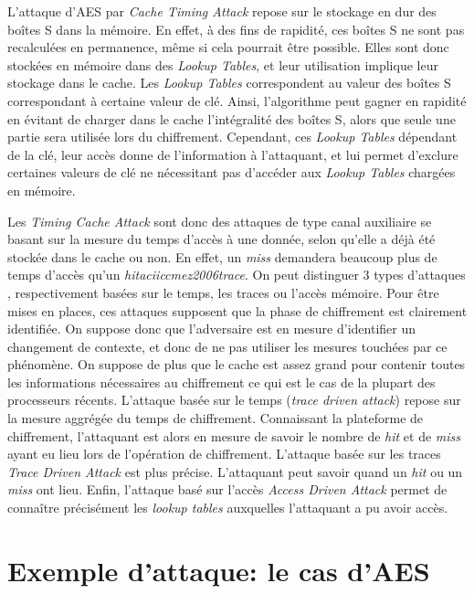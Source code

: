 \documentclass[a4paper,11pt]{article}
\begin{document}
L'attaque d'AES par \emph{Cache Timing Attack} repose sur le stockage en dur des boîtes S dans la mémoire. En effet, à des fins de rapidité, ces boîtes S ne sont pas recalculées en permanence, même si cela pourrait être possible. Elles sont donc stockées en mémoire dans des \emph{Lookup Tables}, et leur utilisation implique leur stockage dans le cache. Les \emph{Lookup Tables} correspondent au valeur des boîtes S correspondant à certaine valeur de clé. Ainsi, l'algorithme peut gagner en rapidité en évitant de charger dans le cache l'intégralité des boîtes S, alors que seule une partie sera utilisée lors du chiffrement. Cependant, ces \emph{Lookup Tables} dépendant de la clé, leur accès donne de l'information à l'attaquant, et lui permet d'exclure certaines valeurs de clé ne nécessitant pas d'accéder aux \emph{Lookup Tables} chargées en mémoire.


Les \emph{Timing Cache Attack} sont donc des attaques de type canal auxiliaire se basant sur la mesure du temps d'accès à une donnée, selon qu'elle a déjà été stockée dans le cache ou non. En effet, un \emph{miss} demandera beaucoup plus de temps d'accès qu'un \emph{hitaciiccmez2006trace}. On peut distinguer 3 types d'attaques \cite{aciiccmez2006trace}, respectivement basées sur le temps, les traces ou l'accès mémoire.
Pour être mises en places, ces attaques supposent que la phase de chiffrement est clairement identifiée. On suppose donc que l'adversaire est en mesure d'identifier un changement de contexte, et donc de ne pas utiliser les mesures touchées par ce phénomène. On suppose de plus que le cache est assez grand pour contenir toutes les informations nécessaires au chiffrement ce qui est le cas de la plupart des processeurs récents.
L'attaque basée sur le temps (\emph{trace driven attack}) repose sur la mesure aggrégée du temps de chiffrement. Connaissant la plateforme de chiffrement, l'attaquant est alors en mesure de savoir le nombre de \emph{hit} et de \emph{miss} ayant eu lieu lors de l'opération de chiffrement.
L'attaque basée sur les traces \emph{Trace Driven Attack} est plus précise. L'attaquant peut savoir quand un \emph{hit} ou un \emph{miss} ont lieu.
Enfin, l'attaque basé sur l'accès \emph{Access Driven Attack} permet de connaître précisément les \emph{lookup tables} auxquelles l'attaquant a pu avoir accès.

\section{Exemple d'attaque: le cas d'AES} 
\end{document}
